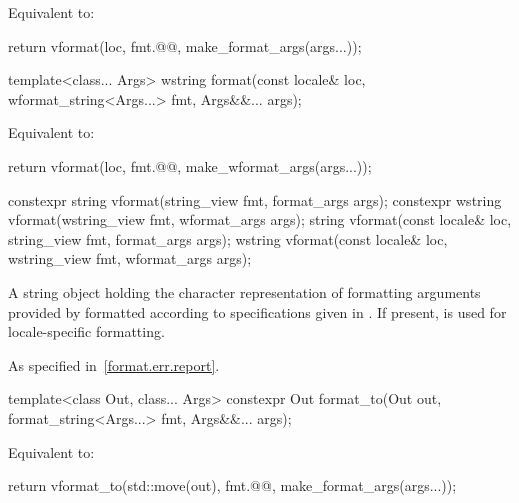 \begin{itemdescr}
\pnum
\effects
Equivalent to:
\begin{codeblock}
return vformat(loc, fmt.@@, make_format_args(args...));
\end{codeblock}
\end{itemdescr}

%
\begin{itemdecl}
template<class... Args>
  wstring format(const locale& loc, wformat_string<Args...> fmt, Args&&... args);
\end{itemdecl}

\begin{itemdescr}
\pnum
\effects
Equivalent to:
\begin{codeblock}
return vformat(loc, fmt.@@, make_wformat_args(args...));
\end{codeblock}
\end{itemdescr}

%
\begin{itemdecl}
constexpr string vformat(string_view fmt, format_args args);
constexpr wstring vformat(wstring_view fmt, wformat_args args);
string vformat(const locale& loc, string_view fmt, format_args args);
wstring vformat(const locale& loc, wstring_view fmt, wformat_args args);
\end{itemdecl}

\begin{itemdescr}
\pnum
\returns
A string object holding the character representation of
formatting arguments provided by  formatted according to
specifications given in .
If present,  is used for locale-specific formatting.

\pnum
\throws
As specified in~\ref{format.err.report}.
\end{itemdescr}

%
\begin{itemdecl}
template<class Out, class... Args>
  constexpr Out format_to(Out out, format_string<Args...> fmt, Args&&... args);
\end{itemdecl}

\begin{itemdescr}
\pnum
\effects
Equivalent to:
\begin{codeblock}
return vformat_to(std::move(out), fmt.@@, make_format_args(args...));
\end{codeblock}
\end{itemdescr}

